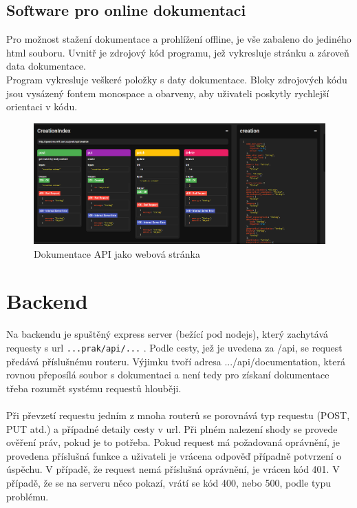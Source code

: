 \subsection{Software pro online dokumentaci}
Pro možnost stažení dokumentace a prohlížení offline, je vše zabaleno do jediného html souboru.
Uvnitř je zdrojový kód programu, jež vykresluje stránku a zároveň data dokumentace.
\\
Program vykresluje veškeré položky s daty dokumentace.
Bloky zdrojových kódu jsou vysázený fontem monospace a obarveny, aby uživateli
poskytly rychlejší orientaci v kódu.
\\
\begin{figure}[H]
	\centering
	\includegraphics[width=\linewidth]{img/documentationPreview.PNG}
	\caption{Dokumentace API jako webová stránka}
\end{figure}


\section{Backend}
Na backendu je spuštěný express server (bežící pod nodejs), který
zachytává requesty s url \texttt{...prak/api/...} .
Podle cesty, jež je uvedena za /api, se request předává
příslušnému routeru. Výjimku tvoří adresa .../api/documentation, která
rovnou přeposílá soubor s dokumentaci a není tedy pro získaní dokumentace
třeba rozumět systému requestů hlouběji.
\\
\\
Při převzetí requestu jedním z mnoha routerů se porovnává
typ requestu (POST, PUT atd.) a případné detaily cesty v url.
Při plném nalezení shody se provede ověření práv, pokud je to potřeba.
Pokud request má požadovaná oprávnění, je provedena příslušná funkce
a uživateli je vrácena odpověď případně potvrzení o úspěchu.
V případě, že request nemá příslušná oprávnění, je vrácen kód 401.
V případě, že se na serveru něco pokazí, vrátí se kód 400, nebo 500, podle typu problému.

